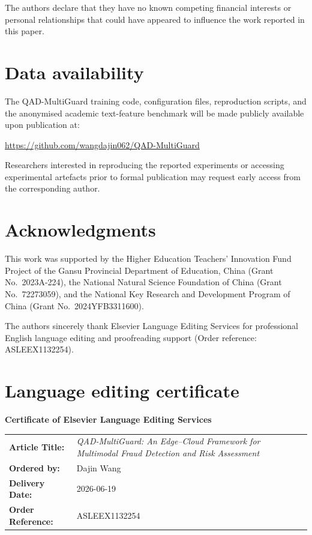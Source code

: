 \documentclass[a4paper,fleqn]{cas-sc}
\begin{document}
The authors declare that they have no known competing financial interests or personal relationships that could have appeared to influence the work reported in this paper.

\section*{Data availability}

The QAD-MultiGuard training code, configuration files, reproduction scripts, and the anonymised academic text-feature benchmark will be made publicly available upon publication at:

\url{https://github.com/wangdajin062/QAD-MultiGuard}

Researchers interested in reproducing the reported experiments or accessing experimental artefacts prior to formal publication may request early access from the corresponding author.

\section*{Acknowledgments}

This work was supported by the Higher Education Teachers' Innovation Fund Project of the Gansu Provincial Department of Education, China (Grant No.~2023A-224), the National Natural Science Foundation of China (Grant No.~72273059), and the National Key Research and Development Program of China (Grant No.~2024YFB3311600).

The authors sincerely thank Elsevier Language Editing Services for professional English language editing and proofreading support (Order reference: ASLEEX1132254).

\section*{Language editing certificate}

\noindent
\textbf{Certificate of Elsevier Language Editing Services}

\vspace{0.6em}

\renewcommand{\arraystretch}{1.2}

\begin{tabular}{p{4.2cm} p{10cm}}
\textbf{Article Title:} &
\textit{QAD-MultiGuard: An Edge--Cloud Framework for Multimodal Fraud Detection and Risk Assessment} \\
\textbf{Ordered by:} &
Dajin Wang \\
\textbf{Delivery Date:} &
2026-06-19 \\
\textbf{Order Reference:} &
ASLEEX1132254 \\
\end{tabular}
\end{document}
